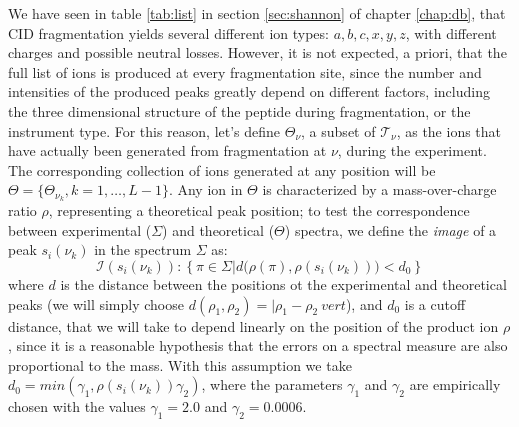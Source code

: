 We have seen in table \ref{tab:list} in section \ref{sec:shannon} of chapter
\ref{chap:db}, that CID fragmentation yields several different ion types:
$a,b,c,x,y,z$, with different charges and possible neutral losses. 
However, it 
is not expected, a priori,  that the full list of ions is produced at every fragmentation 
site, since the number and intensities of the
produced peaks greatly depend on different factors, including the three dimensional structure of
the peptide during fragmentation, or the instrument type.
For this reason, let's define  $\Theta_\nu$, a subset of $\mathcal T_\nu$,  as
the ions that have actually been generated from fragmentation at $\nu$, during
the experiment.
The corresponding collection of ions generated at any position will be
$\Theta=\{\Theta_{\nu_k}, k=1,\dots,L-1\}$. 
Any ion in $\Theta$ is characterized by a  mass-over-charge ratio $\rho$,
representing a theoretical peak position; to test the correspondence between
experimental  ($\Sigma$) and theoretical ($\Theta$)
spectra, we define the \emph{image} of a peak $s_i(\nu_k)$ in the spectrum $\Sigma$ as:
\begin{equation}
\mathcal I(s_i(\nu_k)):
\left\{
\pi\in\Sigma |
d\big(\rho(\pi),\rho(s_i(\nu_k))\big)<d_0
\right\}
\label{eq:map}
\end{equation}
where $d$ is the distance between the positions ot the experimental and
theoretical peaks (we will simply choose  $d(\rho_1,\rho_2)=\vert \rho_1-\rho_2\
vert $),  and $d_0$ is a cutoff distance, that we will take to depend linearly
on the position  of the product ion $\rho$, since it is  a reasonable hypothesis
that the errors on a spectral measure
are also proportional to the mass. %
With this assumption we take %
$d_0= min(\gamma_1,\rho(s_i(\nu_k)) \gamma_2)$,
where the parameters $\gamma_1$ and $\gamma_2$ are empirically chosen with the
values $\gamma_1=2.0$ and $\gamma_2=0.0006$.

